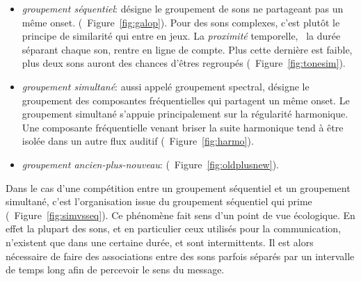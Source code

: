 \begin{itemize}
\item \emph{groupement séquentiel}: désigne le groupement de sons ne partageant pas un même onset.   (\Cf~Figure~\ref{fig:galop}). Pour des sons complexes, c'est plutôt le principe de similarité qui entre en jeux. La \emph{proximité} temporelle, \ie~la durée séparant chaque son, rentre   en ligne de compte. Plus cette dernière est faible, plus deux sons auront des chances d'êtres regroupés (\Cf~Figure~\ref{fig:tonesim}).
\item \emph{groupement simultané}: aussi appelé groupement spectral, désigne le groupement des composantes fréquentielles qui partagent un même onset. Le groupement simultané s'appuie principalement sur la régularité harmonique. Une composante fréquentielle venant briser la suite harmonique tend à être isolée dans un autre flux auditif (\Cf~Figure~\ref{fig:harmo}).
\item \emph{groupement ancien-plus-nouveau}:   (\Cf~Figure~\ref{fig:oldplusnew}).
\end{itemize}

Dans le cas d'une compétition entre un groupement séquentiel et un groupement simultané, c'est l'organisation issue du groupement séquentiel qui prime (\Cf~Figure~\ref{fig:simvsseq}). Ce phénomène fait sens d'un point de vue écologique. En effet la plupart des sons, et en particulier ceux utilisés pour la communication, n'existent que dans une certaine durée, et sont intermittents. Il est alors nécessaire de faire des associations entre des sons parfois séparés par un intervalle de temps long afin de percevoir le sens du message. \citep{winkler2009modeling}

